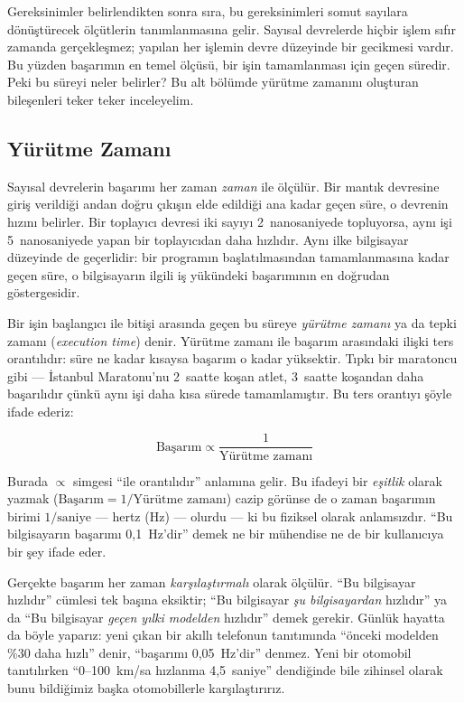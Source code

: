 Gereksinimler belirlendikten sonra sıra, bu gereksinimleri somut sayılara dönüştürecek ölçütlerin tanımlanmasına gelir. Sayısal devrelerde hiçbir işlem sıfır zamanda gerçekleşmez; yapılan her işlemin devre düzeyinde bir gecikmesi vardır. Bu yüzden başarımın en temel ölçüsü, bir işin tamamlanması için geçen süredir. Peki bu süreyi neler belirler? Bu alt bölümde yürütme zamanını oluşturan bileşenleri teker teker inceleyelim.

\subsection{Yürütme Zamanı}
\label{subsec:yurutme-zamani}

Sayısal devrelerin başarımı her zaman \emph{zaman} ile ölçülür. Bir mantık devresine giriş verildiği andan doğru çıkışın elde edildiği ana kadar geçen süre, o devrenin hızını belirler. Bir toplayıcı devresi iki sayıyı 2~nanosaniyede topluyorsa, aynı işi 5~nanosaniyede yapan bir toplayıcıdan daha hızlıdır. Aynı ilke bilgisayar düzeyinde de geçerlidir: bir programın başlatılmasından tamamlanmasına kadar geçen süre, o bilgisayarın ilgili iş yükündeki başarımının en doğrudan göstergesidir.

Bir işin başlangıcı ile bitişi arasında geçen bu süreye \emph{yürütme zamanı} ya da tepki zamanı (\emph{execution time}) denir. Yürütme zamanı ile başarım arasındaki ilişki ters orantılıdır: süre ne kadar kısaysa başarım o kadar yüksektir. Tıpkı bir maratoncu gibi --- İstanbul Maratonu'nu 2~saatte koşan atlet, 3~saatte koşandan daha başarılıdır çünkü aynı işi daha kısa sürede tamamlamıştır. Bu ters orantıyı şöyle ifade ederiz:

\begin{equation}
\text{Başarım} \propto \frac{1}{\text{Yürütme zamanı}}
\label{eq:basarim}
\end{equation}

Burada $\propto$ simgesi ``ile orantılıdır'' anlamına gelir. Bu ifadeyi bir \emph{eşitlik} olarak yazmak ($\text{Başarım} = 1/\text{Yürütme zamanı}$) cazip görünse de o zaman başarımın birimi $1/\text{saniye}$ --- hertz (Hz) --- olurdu --- ki bu fiziksel olarak anlamsızdır. ``Bu bilgisayarın başarımı 0,1~Hz'dir'' demek ne bir mühendise ne de bir kullanıcıya bir şey ifade eder.

Gerçekte başarım her zaman \emph{karşılaştırmalı} olarak ölçülür. ``Bu bilgisayar hızlıdır'' cümlesi tek başına eksiktir; ``Bu bilgisayar \emph{şu bilgisayardan} hızlıdır'' ya da ``Bu bilgisayar \emph{geçen yılki modelden} hızlıdır'' demek gerekir. Günlük hayatta da böyle yaparız: yeni çıkan bir akıllı telefonun tanıtımında ``önceki modelden \%30 daha hızlı'' denir, ``başarımı 0,05~Hz'dir'' denmez. Yeni bir otomobil tanıtılırken ``0--100~km/sa hızlanma 4,5~saniye'' dendiğinde bile zihinsel olarak bunu bildiğimiz başka otomobillerle karşılaştırırız.

